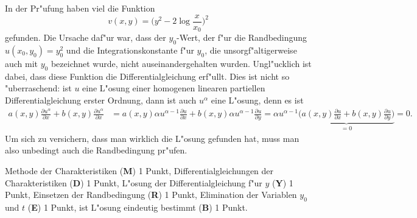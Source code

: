 \begin{diskussion}
In der Pr"ufung haben viel die Funktion
\[
v(x,y)=\biggl(y^2-2\log\frac{x}{x_0}\biggr)^2
\]
gefunden.
Die Ursache daf"ur war, dass der $y_0$-Wert, der f"ur die Randbedingung
$u(x_0,y_0)=y_0^2$ und die Integrationskonstante f"ur $y_0$, die
unsorgf"altigerweise auch mit $y_0$ bezeichnet wurde, nicht
auseinandergehalten wurden.
Ungl"ucklich ist dabei, dass diese Funktion die Differentialgleichung
erf"ullt.
Dies ist nicht so "uberraschend: ist $u$ eine L"osung einer homogenen
linearen partiellen Differentialgleichung erster Ordnung, dann ist auch
$u^\alpha$ eine L"osung, denn es ist
\begin{align*}
a(x,y)\frac{\partial u^{\alpha}}{\partial x}
+
b(x,y)\frac{\partial u^{\alpha}}{\partial x}
&=
a(x,y)\alpha u^{\alpha-1}\frac{\partial u}{\partial x}
+
b(x,y)\alpha u^{\alpha-1}\frac{\partial u}{\partial y}
=
\alpha u^{\alpha-1}\underbrace{
\biggl(a(x,y)\frac{\partial u}{\partial x}
+
b(x,y)\frac{\partial u}{\partial y}\biggr)}_{\displaystyle=0}=0.
\end{align*}
Um sich zu versichern, dass man wirklich die L"osung gefunden hat, muss
man also unbedingt auch die Randbedingung pr"ufen.
\end{diskussion}

\begin{bewertung}
Methode der Charakteristiken ({\bf M}) 1 Punkt,
Differentialgleichungen der Charakteristiken ({\bf D}) 1 Punkt,
L"osung der Differentialgleichung f"ur $y$ ({\bf Y}) 1 Punkt,
Einsetzen der Randbedingung ({\bf R}) 1 Punkt,
Elimination der Variablen $y_0$ und $t$ ({\bf E}) 1 Punkt,
ist L"osung eindeutig bestimmt ({\bf B}) 1 Punkt.
\end{bewertung}

